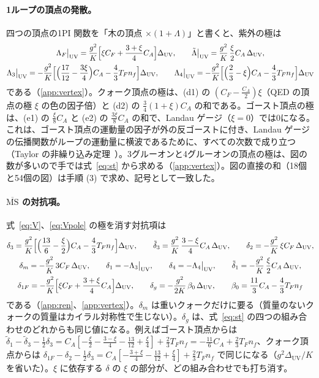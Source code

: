 \documentclass[a4paper,10pt]{ltjsarticle}
\newcommand{\MSbar}{\overline{\mathrm{MS}}}
\newcommand{\DUV}{\Delta_{\mathrm{UV}}}
\begin{document}
\paragraph{1ループの頂点の発散。}四つの頂点の1PI 関数を「木の頂点 $\times(1+\Lambda)$」と書くと、紫外の極は
\begin{equation}
\begin{gathered}
\Lambda_F\big|_{\mathrm{UV}}=\frac{g^2}{K}\Bigl[\xi C_F+\frac{3+\xi}{4}C_A\Bigr]\DUV,\qquad
\tilde\Lambda\big|_{\mathrm{UV}}=\frac{g^2}{K}\,\frac{\xi}{2}C_A\,\DUV,\\
\Lambda_3\big|_{\mathrm{UV}}=-\frac{g^2}{K}\Bigl[\Bigl(\frac{17}{12}-\frac{3\xi}{4}\Bigr)C_A-\frac43T_Fn_f\Bigr]\DUV,\qquad
\Lambda_4\big|_{\mathrm{UV}}=-\frac{g^2}{K}\Bigl[\Bigl(\frac23-\xi\Bigr)C_A-\frac43T_Fn_f\Bigr]\DUV
\end{gathered}
\label{eq:Vpole}
\end{equation}
である（\ref{app:vertex}）。クォーク頂点の極は、(d1) の $(C_F-\frac{C_A}2)\xi$（QED の頂点の極 $\xi$ の色の因子倍）と (d2) の $\frac34(1+\xi)C_A$ の和である。ゴースト頂点の極は、(e1) の $\frac\xi8C_A$ と (e2) の $\frac{3\xi}{8}C_A$ の和で、Landau ゲージ（$\xi=0$）では0になる。これは、ゴースト頂点の運動量の因子が外の反ゴーストに付き、Landau ゲージの伝播関数がループの運動量に横波であるために、すべての次数で成り立つ（Taylor の非繰り込み定理~\cite{taylor}）。3グルーオンと4グルーオンの頂点の極は、図の数が多いので手では式~\eqref{eq:st} から求める（\ref{app:vertex}）。図の直接の和（18個と54個の図）は手順 (3) で求め、記号として一致した。

\paragraph{$\MSbar$ の対抗項。}式~\eqref{eq:V}、\eqref{eq:Vpole} の極を消す対抗項は
\begin{equation}
\begin{gathered}
\delta_3=\frac{g^2}{K}\Bigl[\Bigl(\frac{13}{6}-\frac\xi2\Bigr)C_A-\frac43T_Fn_f\Bigr]\DUV,\qquad
\tilde\delta_3=\frac{g^2}{K}\,\frac{3-\xi}{4}C_A\,\DUV,\qquad
\delta_2=-\frac{g^2}{K}\,\xi C_F\,\DUV,\\
\delta_m=-\frac{g^2}{K}\,3C_F\,\DUV,\qquad
\delta_1=-\Lambda_3\big|_{\mathrm{UV}},\qquad
\delta_4=-\Lambda_4\big|_{\mathrm{UV}},\qquad
\tilde\delta_1=-\frac{g^2}{K}\,\frac\xi2C_A\,\DUV,\\
\delta_{1F}=-\frac{g^2}{K}\Bigl[\xi C_F+\frac{3+\xi}4C_A\Bigr]\DUV,\qquad
\delta_g=-\frac{g^2}{2K}\,\beta_0\,\DUV,\qquad \beta_0=\frac{11}{3}C_A-\frac43T_Fn_f
\end{gathered}
\label{eq:ct}
\end{equation}
である（\ref{app:ren}、\ref{app:vertex}）。$\delta_m$ は重いクォークだけに要る（質量のないクォークの質量はカイラル対称性で生じない）。$\delta_g$ は、式~\eqref{eq:st} の四つの組み合わせのどれからも同じ値になる。例えばゴースト頂点からは $\tilde\delta_1-\tilde\delta_3-\frac12\delta_3=C_A[-\frac\xi2-\frac{3-\xi}{4}-\frac{13}{12}+\frac\xi4]+\frac23T_Fn_f=-\frac{11}{6}C_A+\frac23T_Fn_f$、クォーク頂点からは $\delta_{1F}-\delta_2-\frac12\delta_3=C_A[-\frac{3+\xi}4-\frac{13}{12}+\frac\xi4]+\frac23T_Fn_f$ で同じになる（$g^2\DUV/K$ を省いた）。$\xi$ に依存する $\delta$ の $\xi$ の部分が、どの組み合わせでも打ち消す。
\end{document}
